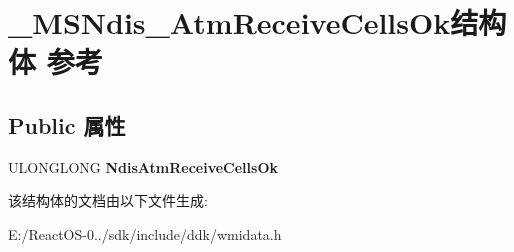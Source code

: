 \hypertarget{struct___m_s_ndis___atm_receive_cells_ok}{}\section{\+\_\+\+M\+S\+Ndis\+\_\+\+Atm\+Receive\+Cells\+Ok结构体 参考}
\label{struct___m_s_ndis___atm_receive_cells_ok}
\subsection*{Public 属性}
\begin{DoxyCompactItemize}
\item 
\mbox{\label{struct___m_s_ndis___atm_receive_cells_ok_a221d83d043ef22737b42aa8f20fb28c0}} 
U\+L\+O\+N\+G\+L\+O\+NG {\bfseries Ndis\+Atm\+Receive\+Cells\+Ok}
\end{DoxyCompactItemize}


该结构体的文档由以下文件生成\+:\begin{DoxyCompactItemize}
\item 
E\+:/\+React\+O\+S-\/0../sdk/include/ddk/wmidata.\+h\end{DoxyCompactItemize}
